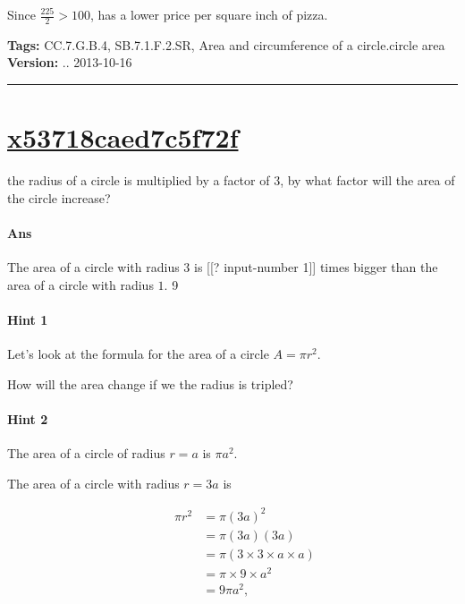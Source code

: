 \documentclass[twocolumn,10pt]{article}
\begin{document}
Since $\frac{225}{2} > 100$, \DIFdelbegin {}\DIFdelend \DIFaddbegin {}\DIFaddend has a lower price per square inch of pizza.



\medskip
\noindent
\textbf{Tags:} {\footnotesize CC.7.G.B.4, SB.7.1.F.2.SR, Area and circumference of a circle.circle area}\\
\textbf{Version:} \DIFdelbegin {}\DIFdelend \DIFaddbegin {}\DIFaddend .. 2013-10-16
\smallskip\hrule





\section{\href{https://www.khanacademy.org/devadmin/content/items/x53718caed7c5f72f}{x53718caed7c5f72f}}

\noindent
\DIFdelbegin {}\DIFdelend \DIFaddbegin {}\DIFaddend the radius of a circle is multiplied by a factor of $3$, by what factor will the area of the circle increase?

\paragraph{Ans} \DIFaddbegin {}

\DIFaddend The area of a circle with radius $3$ is [[? input-number 1]] times bigger than the area of a circle with radius $1$.  9

\paragraph{Hint 1}Let's look at the formula for the area of a circle $A=\pi r^2$.  

How will the area change if we the radius is tripled?

\paragraph{Hint 2}The area of a circle of radius $r=a$ is $\pi a^2$.

The area of a circle with radius $r=3a$ is 

\begin{align*}
\qquad 
 \pi r^2 & =\pi (3a)^2  \\
  & =\pi(3a)(3a) \\
  &=\pi(3 \times 3 \times a \times a)  \\
   &= \pi \times 9 \times a^2 \\
   &= 9\pi a^2,
\end{align*} 
\end{document}
